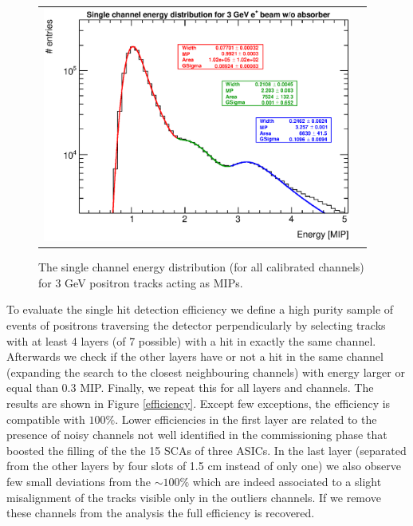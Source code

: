 \documentclass[a4paper,11pt]{article}
\begin{document}
\begin{figure}[!t]
  \centering 
    \begin{tabular}{ll}
      \includegraphics[width=4in]{figs/MIP/MIP3peaks.eps} 
    \end{tabular}
    \caption{The single channel energy distribution (for all calibrated channels) for 3 GeV positron tracks acting as MIPs.}
\label{mip3peaks}
\end{figure}

To evaluate 
the single hit detection efficiency we define a high purity sample of
events of positrons traversing the detector perpendicularly by selecting
tracks with at least 4 layers (of 7 possible) with a hit in exactly the same channel. Afterwards we 
check if the other layers have or not a hit in the same channel (expanding the search
to the closest neighbouring channels) with energy larger or equal than 0.3 MIP.
Finally, we repeat this for all layers 
and channels. The results are shown in Figure \ref{efficiency}. Except few exceptions, the efficiency is 
compatible with $100\%$.
Lower efficiencies in the first layer are related to the presence of
noisy channels not well identified in the commissioning phase that boosted the filling
of the the 15 SCAs of three ASICs. In the last layer (separated from the
other layers by four slots of 1.5 cm instead of only one) we also observe few small deviations
from the $\sim100\%$ which are indeed
associated to a slight misalignment of the tracks visible only in the outliers channels. 
If we remove these channels from the analysis
the full efficiency is recovered.
\end{document}
